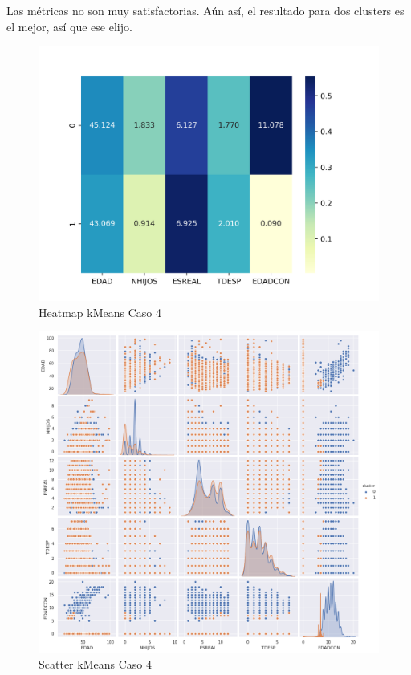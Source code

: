 Las métricas no son muy satisfactorias. Aún así, el resultado para dos clusters es el mejor, así que ese elijo.


\begin{figure}[H] %
	\centering
	\includegraphics[scale=0.5]{heatmap-km4.png}  %
	\caption{Heatmap kMeans Caso 4} 
	\label{fig:hm-km-caso4}
\end{figure}

\begin{figure}[H] %
	\centering
	\includegraphics[scale=0.38]{kmeans4.png}  %
	\caption{Scatter kMeans Caso 4} 
	\label{fig:sc-km-caso4}
\end{figure}

